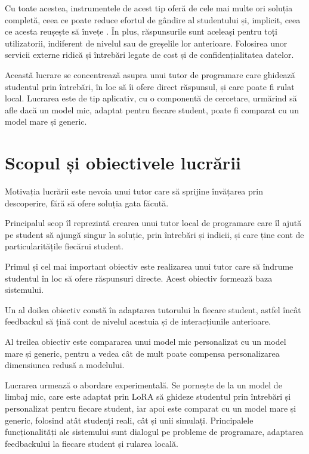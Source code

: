 \documentclass[12pt,a4paper]{report}
\theoremstyle{definition}
\theoremstyle{remark}
\begin{document}
Cu toate acestea, instrumentele de acest tip oferă de cele mai multe ori soluția completă, ceea ce poate reduce efortul de gândire al studentului și, implicit, ceea ce acesta reușește să învețe \cite{liffiton2023codehelp} . În plus, răspunsurile sunt aceleași pentru toți utilizatorii, indiferent de nivelul sau de greșelile lor anterioare. Folosirea unor servicii externe ridică și întrebări legate de cost și de confidențialitatea datelor.

Această lucrare se concentrează asupra unui tutor de programare care ghidează studentul prin întrebări, în loc să îi ofere direct răspunsul, și care poate fi rulat local. Lucrarea este de tip aplicativ, cu o componentă de cercetare, urmărind să afle dacă un model mic, adaptat pentru fiecare student, poate fi comparat cu un model mare și generic.

\section{Scopul și obiectivele lucrării}
Motivația lucrării este nevoia unui tutor care să sprijine învățarea prin descoperire, fără să ofere soluția gata făcută.

Principalul scop îl reprezintă crearea unui tutor local de programare care îl ajută pe student să ajungă singur la soluție, prin întrebări și indicii, și care ține cont de particularitățile fiecărui student.

Primul și cel mai important obiectiv este realizarea unui tutor care să îndrume studentul în loc să ofere răspunsuri directe. Acest obiectiv formează baza sistemului.

Un al doilea obiectiv constă în adaptarea tutorului la fiecare student, astfel încât feedbackul să țină cont de nivelul acestuia și de interacțiunile anterioare.

Al treilea obiectiv este compararea unui model mic personalizat cu un model mare și generic, pentru a vedea cât de mult poate compensa personalizarea dimensiunea redusă a modelului.

Lucrarea urmează o abordare experimentală. Se pornește de la un model de limbaj mic, care este adaptat prin LoRA \cite{hu2022lora} să ghideze studentul prin întrebări și personalizat pentru fiecare student, iar apoi este comparat cu un model mare și generic, folosind atât studenți reali, cât și unii simulați. Principalele funcționalități ale sistemului sunt dialogul pe probleme de programare, adaptarea feedbackului la fiecare student și rularea locală.
\end{document}
